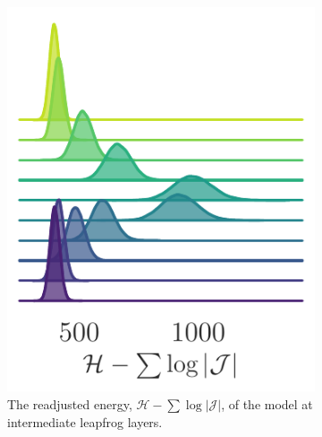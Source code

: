 \documentclass{article} %
\begin{document}
\begin{figure}[htpb]
\begin{subfigure}[h]{0.31\textwidth}
      \includegraphics[width=\textwidth]{figures/ridgeplots/hwf_1548.pdf}
      \caption{\label{fig:hwf}The readjusted energy, \(\mathcal{H}-\sum\log|\mathcal{J}|\), of the model at intermediate leapfrog layers.}
   \end{subfigure}
   \hfill
   \begin{subfigure}[h]{0.31\textwidth}

\end{subfigure}
\end{figure}
\end{document}
